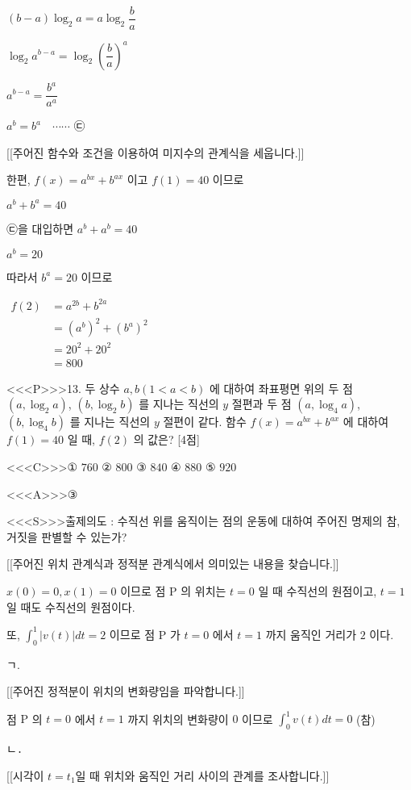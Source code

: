 \documentclass{oblivoir}
\begin{document}
$(b-a) \log _{2} a=a \log _{2} \dfrac{b}{a}$

$\log _{2} a^{b-a}=\log _{2}\left(\dfrac{b}{a}\right)^{a}$

$a^{b-a}=\dfrac{b^{a}}{a^{a}}$

$a^{b}=b^{a} \quad \cdots \cdots$ ㉢

[[주어진 함수와 조건을 이용하여 미지수의 관계식을 세웁니다.]]

한편, $f(x)=a^{b x}+b^{a x}$ 이고
$f(1)=40$ 이므로

$a^{b}+b^{a}=40$

㉢을 대입하면 $a^{b}+a^{b}=40$

$a^{b}=20$

따라서 $b^{a}=20$ 이므로

$\begin{aligned} f(2) &=a^{2 b}+b^{2 a} \\ &=\left(a^{b}\right)^{2}+\left(b^{a}\right)^{2} \\ &=20^{2}+20^{2} \\ &=800 \end{aligned}$


<<<P>>>13. 두 상수 $a, b(1< a< b)$ 에 대하여 좌표평면 위의 두 점 $\left(a, \log _{2} a\right)$, $\left(b, \log _{2} b\right)$ 를 지나는 직선의 $y$ 절편과 두 점 $\left(a, \log _{4} a\right)$, $\left(b, \log _{4} b\right)$ 를 지나는 직선의 $y$ 절편이 같다. 함수 $f(x)=a^{b x}+b^{a x}$ 에 대하여 $f(1)=40$ 일 때, $f(2)$ 의 값은? [4점]

<<<C>>>① $760$
② $800$
③ $840$
④ $880$
⑤ $920$


<<<A>>>③

<<<S>>>출제의도 : 수직선 위를 움직이는 점의 운동에 대하여 주어진 명제의 참, 거짓을 판별할 수 있는가?

[[주어진 위치 관계식과 정적분 관계식에서 의미있는 내용을 찾습니다.]]

$x(0)=0, x(1)=0$ 이므로 점 $\mathrm{P}$ 의 위치는 $t=0$ 일 때 수직선의 원점이고, $t=1$ 일 때도 수직선의 원점이다.

또, $\displaystyle\int_{0}^{1}|v(t)| d t=2$ 이므로 점 $\mathrm{P}$ 가 $t=0$ 에서 $t=1$ 까지 움직인 거리가 $2$ 이다.


ㄱ. 

[[주어진 정적분이 위치의 변화량임을 파악합니다.]]

점 $\mathrm{P}$ 의 $t=0$ 에서 $t=1$ 까지 위치의 변화량이 $0$ 이므로
$\displaystyle\int_{0}^{1} v(t) d t=0$ (참)

ㄴ․

[[시각이 $t=t_{1}$일 때 위치와 움직인 거리 사이의 관계를 조사합니다.]]
\end{document}
